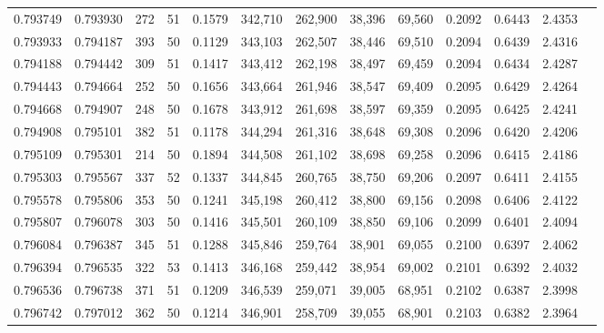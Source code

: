 \begin{tabular}{rrrrrrrrrrrrr}
0.793749 & 0.793930 &   272 &  51 &                                     0.1579 & 342,710 & 262,900 &  38,396 &  69,560 & 0.2092 & 0.6443 & 2.4353 \\
0.793933 & 0.794187 &   393 &  50 &                                     0.1129 & 343,103 & 262,507 &  38,446 &  69,510 & 0.2094 & 0.6439 & 2.4316 \\
0.794188 & 0.794442 &   309 &  51 &                                     0.1417 & 343,412 & 262,198 &  38,497 &  69,459 & 0.2094 & 0.6434 & 2.4287 \\
0.794443 & 0.794664 &   252 &  50 &                                     0.1656 & 343,664 & 261,946 &  38,547 &  69,409 & 0.2095 & 0.6429 & 2.4264 \\
0.794668 & 0.794907 &   248 &  50 &                                     0.1678 & 343,912 & 261,698 &  38,597 &  69,359 & 0.2095 & 0.6425 & 2.4241 \\
0.794908 & 0.795101 &   382 &  51 &                                     0.1178 & 344,294 & 261,316 &  38,648 &  69,308 & 0.2096 & 0.6420 & 2.4206 \\
0.795109 & 0.795301 &   214 &  50 &                                     0.1894 & 344,508 & 261,102 &  38,698 &  69,258 & 0.2096 & 0.6415 & 2.4186 \\
0.795303 & 0.795567 &   337 &  52 &                                     0.1337 & 344,845 & 260,765 &  38,750 &  69,206 & 0.2097 & 0.6411 & 2.4155 \\
0.795578 & 0.795806 &   353 &  50 &                                     0.1241 & 345,198 & 260,412 &  38,800 &  69,156 & 0.2098 & 0.6406 & 2.4122 \\
0.795807 & 0.796078 &   303 &  50 &                                     0.1416 & 345,501 & 260,109 &  38,850 &  69,106 & 0.2099 & 0.6401 & 2.4094 \\
0.796084 & 0.796387 &   345 &  51 &                                     0.1288 & 345,846 & 259,764 &  38,901 &  69,055 & 0.2100 & 0.6397 & 2.4062 \\
0.796394 & 0.796535 &   322 &  53 &                                     0.1413 & 346,168 & 259,442 &  38,954 &  69,002 & 0.2101 & 0.6392 & 2.4032 \\
0.796536 & 0.796738 &   371 &  51 &                                     0.1209 & 346,539 & 259,071 &  39,005 &  68,951 & 0.2102 & 0.6387 & 2.3998 \\
0.796742 & 0.797012 &   362 &  50 &                                     0.1214 & 346,901 & 258,709 &  39,055 &  68,901 & 0.2103 & 0.6382 & 2.3964 \\

\end{tabular}
